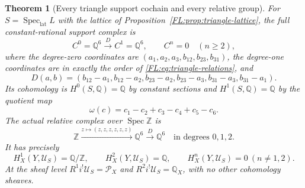 \documentclass[11pt,a4paper]{article}
\newtheorem{theorem}{Theorem}[section]
\theoremstyle{definition}\newtheorem{definition}[theorem]{Definition}
\newcommand{\Spec}{\operatorname{Spec}}\newcommand{\SpecMon}{\operatorname{Spec}_{\mathrm{mon}}}
\newcommand{\SpecLat}{\operatorname{Spec}_{\mathrm{lat}}}
\providecommand{\PP}{\mathcal P}
\providecommand{\RQ}{\mathbb Q}
\begin{document}
\begin{theorem}[Every triangle support cochain and every relative group]
\label{FL:thm:triangle-cohomology}
For $S=\SpecLat L$ with the lattice of
Proposition~\ref{FL:prop:triangle-lattice}, the full constant-rational
support complex is
\[
 C^0=\RQ^6\xrightarrow{D}C^1=\RQ^6,
 \qquad C^n=0\quad(n\ge2),
 \tag{FL34}\label{FL:eq:triangle-complex}
\]
where the degree-zero coordinates are
$(a_1,a_2,a_3,b_{12},b_{23},b_{31})$, the degree-one coordinates are
in exactly the order of \eqref{FL:eq:triangle-relations}, and
\[
 D(a,b)=(b_{12}-a_1,b_{12}-a_2,b_{23}-a_2,
                b_{23}-a_3,b_{31}-a_3,b_{31}-a_1).
 \tag{FL35}\label{FL:eq:triangle-differential}
\]
Its cohomology is $H^0(S,\RQ)=\RQ$ by constant sections and
$H^1(S,\RQ)=\RQ$ by the quotient map
\[
 \omega(c)=c_1-c_2+c_3-c_4+c_5-c_6.
 \tag{FL36}\label{FL:eq:cycle-functional}
\]
The actual relative complex over $\Spec\mathbb Z$ is
\[
 \mathbb Z\xrightarrow{z\mapsto(z,z,z,z,z,z)}\RQ^6
 \xrightarrow{D}\RQ^6
 \quad\text{in degrees }0,1,2.
 \tag{FL37}\label{FL:eq:triangle-relative-complex}
\]
It has precisely
\[
 H_X^1(Y,\mathcal U_S)=\RQ/\mathbb Z,\qquad
 H_X^2(Y,\mathcal U_S)=\RQ,
 \qquad H_X^n(Y,\mathcal U_S)=0\ (n\ne1,2).
 \tag{FL38}\label{FL:eq:triangle-relative-groups}
\]
At the sheaf level $R^1i^!\mathcal U_S=\PP_X$ and
$R^2i^!\mathcal U_S=\RQ_X$, with no other cohomology sheaves.
\end{theorem}
\end{document}
